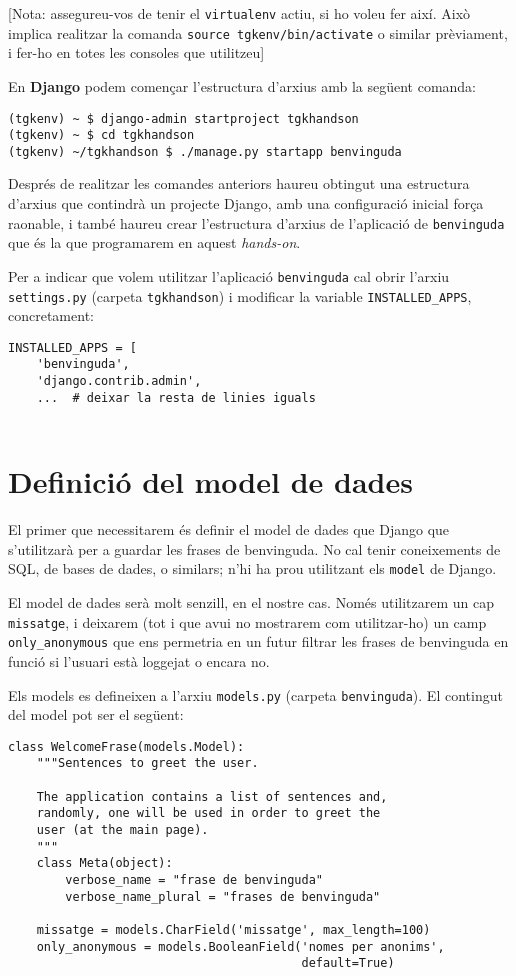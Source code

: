 \documentclass[11pt,a4paper]{article}
\begin{document}
[Nota: assegureu-vos de tenir el \verb+virtualenv+ actiu, si ho voleu fer així. Això implica realitzar la comanda \verb+source tgkenv/bin/activate+ o similar prèviament, i fer-ho en totes les consoles que utilitzeu]

En \textbf{Django} podem començar l'estructura d'arxius amb la següent comanda:

\begin{verbatim}
(tgkenv) ~ $ django-admin startproject tgkhandson
(tgkenv) ~ $ cd tgkhandson
(tgkenv) ~/tgkhandson $ ./manage.py startapp benvinguda
\end{verbatim}

Després de realitzar les comandes anteriors haureu obtingut una estructura d'arxius que contindrà un projecte Django, amb una configuració inicial força raonable, i també haureu crear l'estructura d'arxius de l'aplicació de \verb+benvinguda+ que és la que programarem en aquest \emph{hands-on}.

Per a indicar que volem utilitzar l'aplicació \verb+benvinguda+ cal obrir l'arxiu \verb+settings.py+ (carpeta \verb+tgkhandson+) i modificar la variable \verb+INSTALLED_APPS+, concretament:

\begin{lstlisting}
INSTALLED_APPS = [
    'benvinguda',
    'django.contrib.admin',
    ...  # deixar la resta de linies iguals
    
\end{lstlisting}

\section{Definició del model de dades}

El primer que necessitarem és definir el model de dades que Django que s'utilitzarà per a guardar les frases de benvinguda. No cal tenir coneixements de SQL, de bases de dades, o similars; n'hi ha prou utilitzant els \verb+model+ de Django.

El model de dades serà molt senzill, en el nostre cas. Només utilitzarem un cap \verb+missatge+, i deixarem (tot i que avui no mostrarem com utilitzar-ho) un camp \verb+only_anonymous+ que ens permetria en un futur filtrar les frases de benvinguda en funció si l'usuari està loggejat o encara no.

Els models es defineixen a l'arxiu \verb+models.py+ (carpeta \verb+benvinguda+). El contingut del model pot ser el següent:

\begin{lstlisting}
class WelcomeFrase(models.Model):
    """Sentences to greet the user.

    The application contains a list of sentences and, 
    randomly, one will be used in order to greet the 
    user (at the main page).
    """
    class Meta(object):
        verbose_name = "frase de benvinguda"
        verbose_name_plural = "frases de benvinguda"

    missatge = models.CharField('missatge', max_length=100)
    only_anonymous = models.BooleanField('nomes per anonims', 
                                         default=True)
\end{lstlisting}
\end{document}

